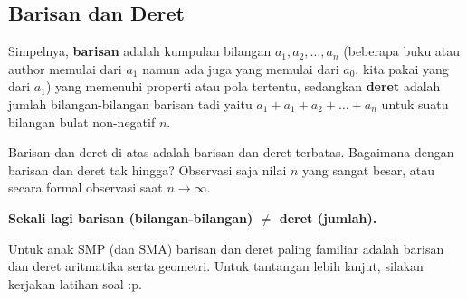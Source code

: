 \subsection{Barisan dan Deret}
Simpelnya, \textbf{barisan} adalah kumpulan bilangan $a_1,a_2,\dots,a_n$ (beberapa buku atau author memulai dari $a_1$ namun ada juga yang memulai dari $a_0$, kita pakai yang dari $a_1$) yang memenuhi properti atau pola tertentu, sedangkan \textbf{deret} adalah jumlah bilangan-bilangan barisan tadi yaitu $a_1+a_1+a_2+\dots+a_n$ untuk suatu bilangan bulat non-negatif $n$.

Barisan dan deret di atas adalah barisan dan deret terbatas. Bagaimana dengan barisan dan deret tak hingga? Observasi saja nilai $n$ yang sangat besar, atau secara formal observasi saat $n \rightarrow \infty.$

\textbf{Sekali lagi barisan (bilangan-bilangan) $\neq$ deret (jumlah).}

Untuk anak SMP (dan SMA) barisan dan deret paling familiar adalah barisan dan deret aritmatika serta geometri. Untuk tantangan lebih lanjut, silakan kerjakan latihan soal :p.




